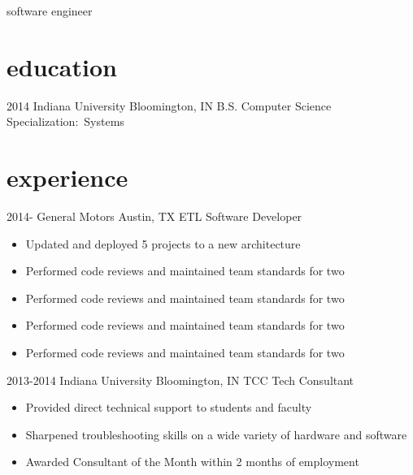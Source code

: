 \documentclass[]{friggeri-cv} %
\begin{document}
 
 
        {software engineer}





\section{education}

 \begin{entrylist}
  \entry
     {2014}
     {Indiana University}
     {Bloomington, IN}
     {B.S. Computer Science}
     {Specialization:~Systems}
    
 \end{entrylist}

 \section{experience}

 \begin{entrylist}
   \entry
     {2014-}
     {General Motors}
     {Austin, TX}
     {ETL Software Developer}
     {\begin{itemize}
         \item Updated and deployed 5 projects to a new architecture 
         \item Performed code reviews and maintained team standards for two
         \item Performed code reviews and maintained team standards for two
         \item Performed code reviews and maintained team standards for two
         \item Performed code reviews and maintained team standards for two

     \end{itemize}}
   \entry
     {2013-2014}
     {Indiana University}
     {Bloomington, IN}
     {TCC Tech Consultant}
     {\begin{itemize}
        \item Provided direct technical support to students and faculty
        \item Sharpened troubleshooting skills on a wide variety of hardware and software
        \item Awarded Consultant of the Month within 2 months of employment
     \end{itemize}
     }
 \end{entrylist}
\end{document}
